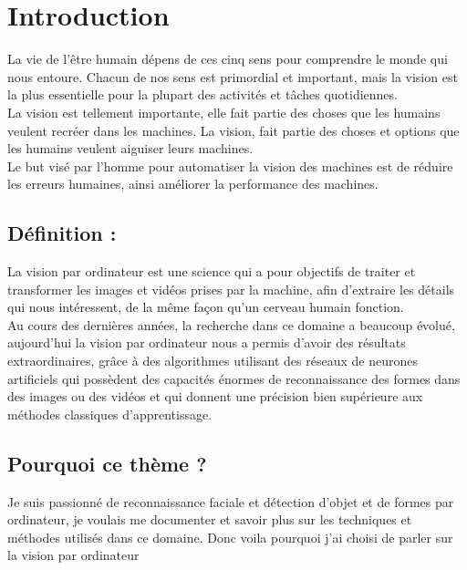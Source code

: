 \section{Introduction}
La vie de l’être humain dépens de ces cinq sens pour comprendre le monde qui nous entoure. Chacun de nos sens  est primordial et important, mais la vision est la plus essentielle pour la plupart des activités et tâches  quotidiennes.\\
La vision est tellement importante, elle fait partie des choses que les humains veulent recréer dans les machines.
La vision, fait partie des choses et options que les humains veulent aiguiser leurs machines. \\
Le but visé par l’homme pour automatiser la vision des machines est de réduire les erreurs humaines, ainsi  améliorer la performance des machines.
\subsection{Définition :}
La vision par ordinateur est une  science qui a pour objectifs de traiter et transformer les images et vidéos prises par la machine, afin d’extraire les détails qui nous intéressent, de la même façon qu’un cerveau humain fonction.\\
Au cours des dernières années, la recherche dans ce domaine a beaucoup évolué, aujourd’hui la vision par ordinateur nous a permis d’avoir des résultats extraordinaires, grâce à des algorithmes utilisant des réseaux de neurones artificiels qui possèdent des capacités énormes de reconnaissance des formes  dans des images ou des vidéos et qui donnent une précision bien supérieure aux méthodes classiques d’apprentissage. 
\subsection{Pourquoi ce thème ?}
Je suis passionné de reconnaissance faciale et détection d'objet et de formes par ordinateur, je voulais me documenter et savoir plus sur les techniques et méthodes utilisés dans ce domaine.
Donc voila pourquoi j'ai choisi de parler sur la vision par ordinateur  